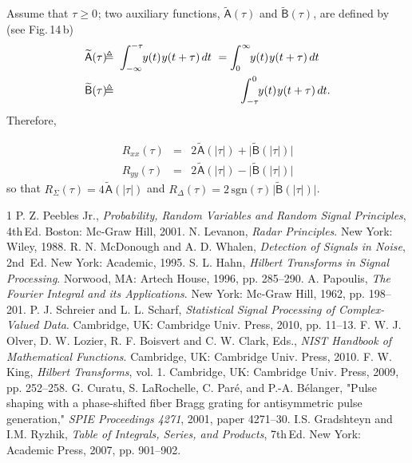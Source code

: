 \documentclass[journal]{IEEEtran}
\begin{document}
\vspace{0.1cm}
 Assume that $\tau \ge 0\mspace{1mu}$; 
two auxiliary functions, $\widetilde{\mathsf{A}}(\tau)$ and $\widetilde{\mathsf{B}}(\tau)$, 
are defined by (see Fig.\,14\,b)
\begin{eqnarray*}
	\widetilde{\mathsf{A}}(\tau) \mspace{-8mu}&\triangleq&\mspace{-8mu} \int_{-\infty}^{-\tau} \mspace{-5mu}
	y(t)\mspace{1mu} y(t+\tau) \, dt \,\,
	= \int_{\mspace{-1mu}0}^{\mspace{1mu}\infty} \mspace{-5mu}
	y(t)\mspace{1mu} y(t+\tau) \, dt  \quad \\
	\widetilde{\mathsf{B}}(\tau) \mspace{-8mu}&\triangleq&\mspace{-8mu} \int_{-\tau}^{\mspace{1mu}0} \mspace{-5mu}
	y(t)\mspace{1mu} y(t+\tau) \, dt.
\end{eqnarray*}
Therefore,
${}$

\vspace{-0.7cm}
\begin{eqnarray}
R_{xx}(\tau)\!\! &\!\!=\!\!& \! 2\mspace{1mu} \widetilde{\mathsf{A}}(|\tau|) 
+ \big|\widetilde{\mathsf{B}}(|\tau|)\big|\\
R_{yy}(\tau)\!\! &\!\!=\!\!& \! 2\mspace{1mu}\widetilde{\mathsf{A}}(|\tau|) 
- \big|\widetilde{\mathsf{B}}(|\tau|)\big|
\end{eqnarray}
so that $R_\Sigma(\tau) = 4\mspace{1mu} \widetilde{\mathsf{A}}(|\tau|)$ and 
$R_\Delta(\tau) = 2\mspace{3mu}\mathrm{sgn}(\tau) \mspace{1mu}\big| \widetilde{\mathsf{B}}(|\tau|)\big|$.

\begin{thebibliography}{1}
	\bibitem{}
	P. Z. Peebles Jr., {\it {Probability, Random Variables and Random Signal Principles}}, 4th\,Ed. Boston: Mc-Graw Hill, 2001.
	\bibitem{}
	N. Levanon, {\it {Radar Principles}}. New York: Wiley, 1988.
	\bibitem{}
	R. N. McDonough and A. D. Whalen, {\it {Detection of Signals in Noise}}, 2nd\!~Ed. New York: Academic, 1995.
	\bibitem{}
	S. L. Hahn, {\it {Hilbert Transforms in Signal Processing}}. 
	Norwood, MA: Artech House, 1996, pp. 285--290.
	\bibitem{}
	A. Papoulis, {\it {The Fourier Integral and its Applications}}. New York: Mc-Graw Hill, 1962, pp. 198--201.
	\bibitem{}
	P. J. Schreier and L. L. Scharf, {\it {Statistical Signal Processing of Complex-Valued Data}}. Cambridge, UK: Cambridge Univ. Press, 2010, pp. 11--13.	
	\bibitem{}
	F. W. J. Olver, D. W. Lozier, R. F. Boisvert and C. W. Clark, Eds., 
	{\it {NIST Handbook of Mathematical Functions}}. Cambridge, UK:
	Cambridge Univ. Press, 2010.
	\bibitem{}
	F. W. King, {\it {Hilbert Transforms}}, vol. 1. Cambridge, UK: Cambridge Univ. Press, 2009, pp. 252--258.
	\bibitem{}
	G. Curatu, S. LaRochelle, C. Par\'e, and P.-A. B\'elanger, "Pulse shaping with a phase-shifted fiber Bragg grating for antisymmetric pulse generation," {\it {SPIE Proceedings 4271}}, 2001, paper 4271--30. 
	\bibitem{}
	I.S. Gradshteyn and I.M. Ryzhik, {\it {Table of Integrals, Series, and Products}}, 7th\,Ed. New York: Academic Press, 2007, pp. 901--902.
	\end{thebibliography}
\end{document}
